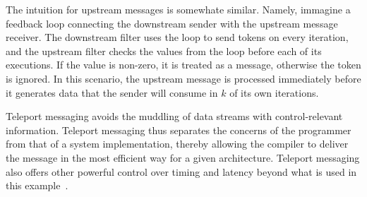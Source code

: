 The intuition for upstream messages is somewhate similar. Namely,
immagine a feedback loop connecting the downstream sender with the
upstream message receiver. The downstream filter uses the loop to send
tokens on every iteration, and the upstream filter checks the values
from the loop before each of its executions. If the value is non-zero,
it is treated as a message, otherwise the token is ignored. In this
scenario, the upstream message is processed immediately before it
generates data that the sender will consume in $k$ of its own
iterations.

Teleport messaging avoids the muddling of data streams with
control-relevant information. Teleport messaging thus separates the
concerns of the programmer from that of a system implementation,
thereby allowing the compiler to deliver the message in the most
efficient way for a given architecture. Teleport messaging also offers
other powerful control over timing and latency beyond what is used in
this example~\cite{thies05ppopp}.
